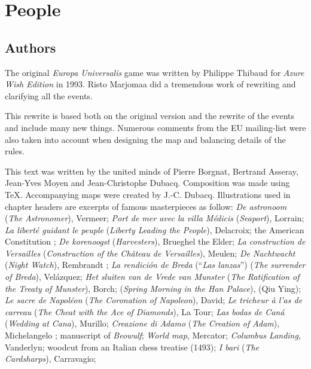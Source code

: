 

\chapter*{People}

\section*{Authors}

The original \emph{Europa Universalis} game was written by Philippe Thibaud
for \emph{Azure Wish Edition} in 1993. Risto Marjomaa did a tremendous work of
rewriting and clarifying all the events.

This rewrite is based both on the original version and the rewrite of the
events and include many new things. Numerous comments from the EU mailing-list
were also taken into account when designing the map and balancing details of
the rules.

This text was written by the united minds of Pierre Borgnat, Bertrand Asseray,
Jean-Yves Moyen and Jean-Christophe Dubacq. Composition was made using
\TeX. Accompanying maps were created by J.-C. Dubacq. Illustrations used in
chapter headers are excerpts of famous masterpieces as follow:
\emph{De astronoom} (\emph{The Astronomer}), %
Vermeer;
\emph{Port de mer avec la villa Médicis} (\emph{Seaport}), %
Lorrain;
\emph{La liberté guidant le peuple} (\emph{Liberty Leading the People}),
Delacroix;
the American Constitution%
;
\emph{De korenoogst} (\emph{Harvesters}), %
Brueghel the Elder;
\emph{La construction de Versailles} (\emph{Construction of the Château de
  Versailles}), %
Meulen;
\emph{De Nachtwacht} (\emph{Night Watch}), Rembrandt%
;
\emph{La rendición de Breda} (``\emph{Las lanzas}'') (\emph{The surrender of
  Breda}), %
Velázquez;
\emph{Het sluiten van de Vrede van Munster} (\emph{The Ratification of the Treaty of Munster}), %
Borch;
 (\emph{Spring Morning in the Han Palace}), 
(Qiu Ying);
\emph{Le sacre de Napoléon} (\emph{The Coronation of Napoleon}),
David;
\emph{Le tricheur à l'as de carreau} (\emph{The Cheat with the Ace of
  Diamonds}), %
La Tour;
\emph{Las bodas de Caná} (\emph{Wedding at Cana}), %
Murillo;
\emph{Creazione di Adamo} (\emph{The Creation of Adam}), Michelangelo%
;
manuscript of \emph{Beowulf};
\emph{World map}, %
Mercator;
\emph{Columbus Landing}, %
Vanderlyn;
woodcut from an Italian chess treatise (1493);
\emph{I bari} (\emph{The Cardsharps}), %
Carravagio;


